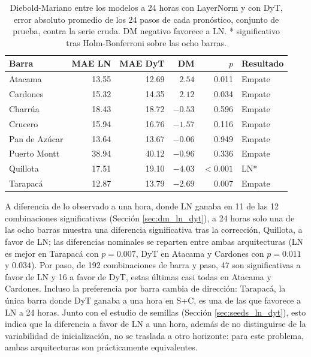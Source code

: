 \begin{table}[htbp]
    \centering
    \begin{tabular}{lrrrrl}
        \toprule
        Barra & MAE LN & MAE DyT & DM & $p$ & Resultado \\
        \midrule
        Atacama       & 13.55 & 12.69 & $2.54$  & 0.011 & Empate \\
        Cardones      & 15.32 & 14.35 & $2.12$  & 0.034 & Empate \\
        Charrúa       & 18.43 & 18.72 & $-0.53$ & 0.596 & Empate \\
        Crucero       & 15.94 & 16.76 & $-1.57$ & 0.116 & Empate \\
        Pan de Azúcar & 13.64 & 13.67 & $-0.06$ & 0.949 & Empate \\
        Puerto Montt  & 38.94 & 40.12 & $-0.96$ & 0.336 & Empate \\
        Quillota      & 17.51 & 19.10 & $-4.03$ & $<0.001$ & LN* \\
        Tarapacá      & 12.87 & 13.79 & $-2.69$ & 0.007 & Empate \\
        \bottomrule
    \end{tabular}
    \vspace{0.2cm}
    \caption{Diebold-Mariano entre los modelos a 24 horas con LayerNorm y con DyT, error absoluto promedio de los 24 pasos de cada pronóstico, conjunto de prueba, contra la serie cruda. DM negativo favorece a LN. * significativo tras Holm-Bonferroni sobre las ocho barras.}
    \label{tab:h24_ln_dyt}
\end{table}

A diferencia de lo observado a una hora, donde LN ganaba en 11 de las 12 combinaciones significativas (Sección \ref{sec:dm_ln_dyt}), a 24 horas solo una de las ocho barras muestra una diferencia significativa tras la corrección, Quillota, a favor de LN; las diferencias nominales se reparten entre ambas arquitecturas (LN es mejor en Tarapacá con $p=0.007$, DyT en Atacama y Cardones con $p=0.011$ y $0.034$). Por paso, de 192 combinaciones de barra y paso, 47 son significativas a favor de LN y 16 a favor de DyT, estas últimas casi todas en Atacama y Cardones. Incluso la preferencia por barra cambia de dirección: Tarapacá, la única barra donde DyT ganaba a una hora en S+C, es una de las que favorece a LN a 24 horas. Junto con el estudio de semillas (Sección \ref{sec:seeds_ln_dyt}), esto indica que la diferencia a favor de LN a una hora, además de no distinguirse de la variabilidad de inicialización, no se traslada a otro horizonte: para este problema, ambas arquitecturas son prácticamente equivalentes.

